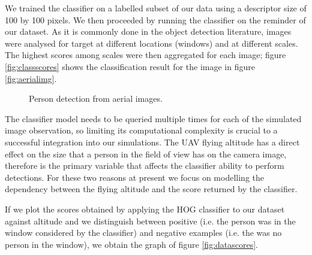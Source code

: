 \documentclass[a4paper,11pt]{report}
\begin{document}
We trained the classifier on a labelled subset of our data using a descriptor size of 100 by 100 pixels. We then proceeded by running the classifier on the reminder of our dataset. As it is commonly done in the object detection literature, images were analysed for target at different locations (windows) and at different scales. The highest scores among scales were then aggregated for each image; figure \ref{fig:classscores} shows the classification result for the image in figure \ref{fig:aerialimg}.
\begin{figure}[ht]
\centering
{}
\caption{Person detection from aerial images.\label{fig:persdetect}}
\end{figure}

The classifier model needs to be queried multiple times for each of the simulated image observation, so limiting its computational complexity is crucial to a successful integration into our simulations.
The UAV flying altitude has a direct effect on the size that a person in the field of view has on the camera image, therefore is the primary variable that affects the classifier ability to perform detections.
For these two reasons at present we focus on modelling the dependency between the flying altitude and the score returned by the classifier.

If we plot the scores obtained by applying the HOG classifier to our dataset against altitude and we distinguish between positive (i.e. the person was in the window considered by the classifier) and negative examples (i.e. the was no person in the window), we obtain the graph of figure \ref{fig:datascores}.
\end{document}
